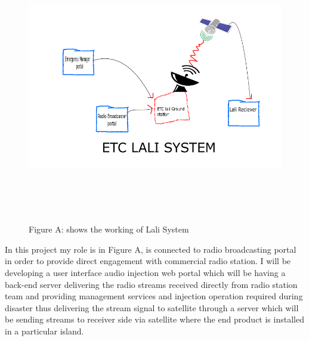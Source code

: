 \begin{figure}
\begin{centering}
\includegraphics[width=12cm,height=12cm,keepaspectratio]{Figures/2.png}
\caption{Figure A: shows the working of Lali System}
\label{radio-transmitter-injection-portal}
\end{centering}
\end{figure} 
In this project my role is in Figure A, is connected to radio broadcasting portal in order to provide direct engagement with commercial radio station. I will be developing a user interface audio injection web portal which will be having a back-end server delivering the radio streams received directly from radio station team and providing management services and injection operation required during disaster thus delivering the stream signal to satellite through a server which will be sending streams to receiver side via satellite where the end product is installed in a particular island.\\

